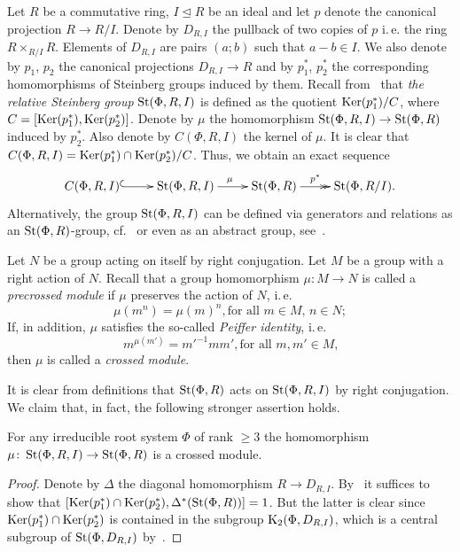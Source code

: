 Let $R$ be a commutative ring, $I \trianglelefteq R$ be an ideal and let $p$ denote the canonical projection $R \to R/I$.
Denote by $D_{R, I}$ the pullback of two copies of $p$ i.\,e. the ring $R \times_{R/I} R$.
Elements of $D_{R, I}$ are pairs $(a; b)$ such that $a-b \in I$.
We also denote by $p_1$, $p_2$ the canonical projections $D_{R, I} \to R$ and by $p_1^*$, $p_2^*$ the corresponding homomorphisms of Steinberg groups induced by them.
Recall from~\cite[Definition~2.5]{LS20} that \textit{the relative Steinberg group} $\operatorname{St}(\Phi, R, I)$ is defined as the quotient
$\operatorname{Ker}(p_1^*) / C$, where $C = [\operatorname{Ker}(p_1^*), \operatorname{Ker}(p_2^*)]$.
Denote by $\mu$ the homomorphism $\operatorname{St}(\Phi, R, I) \to \operatorname{St}(\Phi, R)$ induced by $p_2^*$.
Also denote by $C(\Phi, R, I)$ the kernel of $\mu$.
It is clear that $C(\Phi, R, I) = \operatorname{Ker}(p_1^*) \cap \operatorname{Ker}(p_2^*) / C$.
Thus, we obtain an exact sequence
\begin{equation}
    \xymatrix{C(\Phi, R, I) \ar@{^{(}->}[r] & \St(\Phi, R, I) \ar[r]^\mu & \St(\Phi, R) \ar@{->>}[r]^-{p^*} & \St(\Phi, R/I). }\label{eq:relative-Steinberg}
\end{equation}
Alternatively, the group $\operatorname{St}(\Phi, R, I)$ can be defined via generators and relations as an $\operatorname{St}(\Phi, R)$-group, cf.~\cite[Proposition~6]{S15}
or even as an abstract group, see~\cite{V22}.

\begin{dfn}\label{dfn:crossed-module}
    Let $N$ be a group acting on itself by right conjugation.
    Let $M$ be a group with a right action of $N$.
    Recall that a group homomorphism $\mu\colon M \to N$ is called a \textit{precrossed module} if $\mu$ preserves the action of $N$, i.\,e.
    \[\mu(m^n) = \mu(m)^n, \text{for all $m \in M$, $n\in N;$} \]
    If, in addition, $\mu$ satisfies the so-called \textit{Peiffer identity}, i.\,e.
    \begin{equation}\label{eq:peiffer} {m}^{\mu(m')} = {m'}^{-1} m m', \text{for all $m, m' \in M$,}\end{equation}
    then $\mu$ is called a \textit{crossed module}.
\end{dfn}

It is clear from definitions that $\operatorname{St}(\Phi, R)$ acts on $\operatorname{St}(\Phi, R, I)$ by right conjugation.
We claim that, in fact, the following stronger assertion holds.
\begin{lemma} \label{lem:rel-Steinberg-crossed-module}
For any irreducible root system $\Phi$ of rank $\geq 3$ the homomorphism $\mu \colon \operatorname{St}(\Phi, R, I) \to \operatorname{St}(\Phi, R)$ is a crossed module.
\end{lemma}
\begin{proof}
    Denote by $\Delta$ the diagonal homomorphism $R \to D_{R, I}.$
    By~\cite[Proposition~6]{Lo78} it suffices to show that $[\operatorname{Ker}(p_1^*) \cap \operatorname{Ker}(p_2^*), \Delta^*(\operatorname{St}(\Phi, R))] = 1$.
    But the latter is clear since $\operatorname{Ker}(p_1^*) \cap \operatorname{Ker}(p_2^*)$ is contained in the subgroup $\operatorname{K}_2(\Phi, D_{R, I})$,
     which is a central subgroup of $\operatorname{St}(\Phi, D_{R, I})$ by~\cite{LSV1}.
\end{proof}

